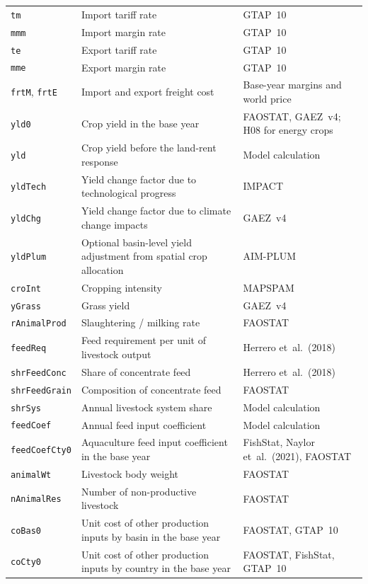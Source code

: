 \begin{xltabular}{\linewidth}{l X l}
  \texttt{tm} & Import tariff rate & GTAP~10 \\
  \texttt{mmm} & Import margin rate & GTAP~10 \\
  \texttt{te} & Export tariff rate & GTAP~10 \\
  \texttt{mme} & Export margin rate & GTAP~10 \\
  \texttt{frtM}, \texttt{frtE} & Import and export freight cost & Base-year margins and world price \\
  \texttt{yld0} & Crop yield in the base year & FAOSTAT, GAEZ~v4; H08 for energy crops \\
  \texttt{yld} & Crop yield before the land-rent response & Model calculation \\
  \texttt{yldTech} & Yield change factor due to technological progress & IMPACT \\
  \texttt{yldChg} & Yield change factor due to climate change impacts & GAEZ~v4 \\
  \texttt{yldPlum} & Optional basin-level yield adjustment from spatial crop allocation & AIM-PLUM \\
  \texttt{croInt} & Cropping intensity & MAPSPAM \\
  \texttt{yGrass} & Grass yield & GAEZ~v4 \\
  \texttt{rAnimalProd} & Slaughtering / milking rate & FAOSTAT \\
  \texttt{feedReq} & Feed requirement per unit of livestock output & Herrero et~al.~(2018) \\
  \texttt{shrFeedConc} & Share of concentrate feed & Herrero et~al.~(2018) \\
  \texttt{shrFeedGrain} & Composition of concentrate feed & FAOSTAT \\
  \texttt{shrSys} & Annual livestock system share & Model calculation \\
  \texttt{feedCoef} & Annual feed input coefficient & Model calculation \\
  \texttt{feedCoefCty0} & Aquaculture feed input coefficient in the base year & FishStat, Naylor et~al.~(2021), FAOSTAT \\
  \texttt{animalWt} & Livestock body weight & FAOSTAT \\
  \texttt{nAnimalRes} & Number of non-productive livestock & FAOSTAT \\
  \texttt{coBas0} & Unit cost of other production inputs by basin in the base year & FAOSTAT, GTAP~10 \\
  \texttt{coCty0} & Unit cost of other production inputs by country in the base year & FAOSTAT, FishStat, GTAP~10 \\

\end{xltabular}
